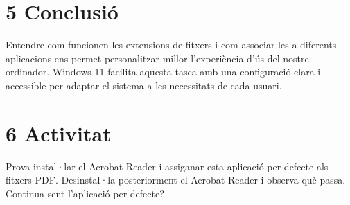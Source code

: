 \documentclass[
  a4paper,
]{article}
\begin{document}
\section{5 Conclusió}\label{conclusiuxf3}

Entendre com funcionen les extensions de fitxers i com associar-les a
diferents aplicacions ens permet personalitzar millor l'experiència d'ús
del nostre ordinador. Windows 11 facilita aquesta tasca amb una
configuració clara i accessible per adaptar el sistema a les necessitats
de cada usuari.

\section{6 Activitat}\label{activitat}

Prova instal·lar el Acrobat Reader i assiganar esta aplicació per
defecte als fitxers PDF. Desinstal·la posteriorment el Acrobat Reader i
observa què passa. Continua sent l'aplicació per defecte?
\end{document}
